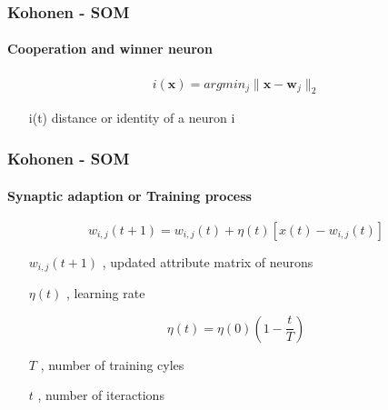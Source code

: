 \documentclass[aspectratio=10]{beamer} %
\begin{document}
\begin{frame}
    \frametitle{Kohonen - SOM}
    \framesubtitle{Cooperation and winner neuron}
	\begin{eqnarray}
	i(\textbf{x})= argmin_{j}  \parallel \textbf{x} - \textbf{w}_{j} \parallel_{2} \nonumber
	\end{eqnarray}
	
	\begin{itemize}
		\centering
		\item[i(t)] distance or identity of a neuron i
	\end{itemize}

\end{frame}



\begin{frame}
 \frametitle{Kohonen - SOM}
 \framesubtitle{Synaptic adaption or Training process}
%

\begin{tcolorbox}[colback=gray!5,colframe=blue!40!black,title=Definition]
\begin{equation}
w_{i,j}(t+1)=w_{i,j}(t)+\eta(t)[x(t)-w_{i,j}(t)] \nonumber
\label{eq2}
\end{equation}  
\end{tcolorbox}

\pause

\begin{itemize}
	\centering
	\item[$w_{i,j}(t+1)$],  updated attribute matrix of neurons
	\item[$\eta(t)$], learning rate
\end{itemize}
\pause
\begin{tcolorbox}[colback=gray!5,colframe=blue!40!black,title=Definition]
\begin{equation}
\eta(t)=\eta(0)    ( 1 -  \frac{t}{T}  ) \nonumber
\label{eq3}
\end{equation}  
\end{tcolorbox}

\begin{itemize}
	\centering
	\item[$T$], number of training cyles
	\pause
	\item[$t$], number of iteractions
\end{itemize}


\end{frame}
\end{document}
